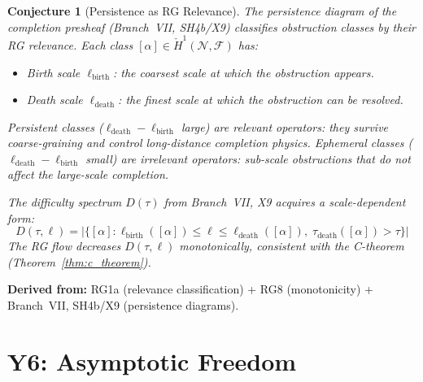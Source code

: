 \documentclass[11pt,letterpaper]{article}
\newtheorem{conjecture}{Conjecture}[section]
\newcommand{\Hcech}{\check{H}}
\newcommand{\sheaf}{\mathcal{F}}
\newcommand{\nerve}{\mathcal{N}}
\begin{document}
\begin{conjecture}[Persistence as RG 
Relevance]\label{conj:persistence}
The persistence diagram of the completion presheaf (Branch~VII, 
SH4b/X9) classifies obstruction classes by their \emph{RG 
relevance}. Each class $[\alpha] \in \Hcech^1(\nerve, \sheaf)$ has:
\begin{itemize}
    \item \emph{Birth scale} $\ell_{\mathrm{birth}}$: the coarsest 
    scale at which the obstruction appears.
    \item \emph{Death scale} $\ell_{\mathrm{death}}$: the finest 
    scale at which the obstruction can be resolved.
\end{itemize}

Persistent classes ($\ell_{\mathrm{death}} - \ell_{\mathrm{birth}}$ 
large) are \emph{relevant operators}: they survive coarse-graining 
and control long-distance completion physics. Ephemeral classes 
($\ell_{\mathrm{death}} - \ell_{\mathrm{birth}}$ small) are 
\emph{irrelevant operators}: sub-scale obstructions that do not 
affect the large-scale completion.

The difficulty spectrum $D(\tau)$ from Branch~VII, X9 acquires a 
scale-dependent form:
\begin{equation}\label{eq:difficulty_rg}
    D(\tau, \ell) = |\{[\alpha] : 
    \ell_{\mathrm{birth}}([\alpha]) \leq \ell 
    \leq \ell_{\mathrm{death}}([\alpha]),\; 
    \tau_{\mathrm{death}}([\alpha]) > \tau\}|
\end{equation}
The RG flow decreases $D(\tau, \ell)$ monotonically, consistent 
with the C-theorem (Theorem~\ref{thm:c_theorem}).
\end{conjecture}

\textbf{Derived from:} RG1a (relevance classification) + RG8 
(monotonicity) + Branch~VII, SH4b/X9 (persistence diagrams).

\section{Y6: Asymptotic Freedom}
\end{document}
